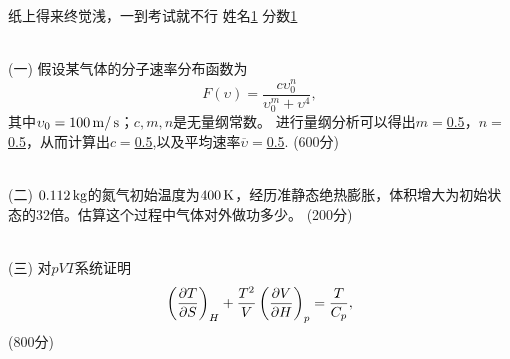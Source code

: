\documentclass[12pt,CJK]{article}
\def\mark#1{{\color{blue} (#1分)}}
\begin{document}
\bch


{\blue 纸上得来终觉浅，一到考试就不行} {} 姓名\uline{1} {\hskip 0.5in} 分数\uline{1}

{\vskip 0.3in}
\ \\
(一) 假设某气体的分子速率分布函数为
$$F(\upsilon) = \frac{c\upsilon_0^n}{\upsilon_0^m + \upsilon^4},$$
其中$\upsilon_0 = 100\,\mathrm{m}/\,\mathrm{s}$；$c, m,n$是无量纲常数。
进行量纲分析可以得出$m = $\uline{0.5}，$n=$\uline{0.5}，从而计算出$c=$\uline{0.5},以及平均速率$\overline{\upsilon} = $\uline{0.5}.  \mark{600}

{\vskip 0.1in}
\ \\
(二) $0.112\,\mathrm{kg}$的氮气初始温度为$400\,\mathrm{K}$，经历准静态绝热膨胀，体积增大为初始状态的$32$倍。估算这个过程中气体对外做功多少。\mark{200}

{\vskip 2.5in}
\ \\
(三) 对$pVT$系统证明 
  $$\left(\frac{\partial T}{\partial S}\right)_{H} +\frac{T^2}{V} \left(\frac{\partial V}{\partial H}\right)_{p} = \frac{T}{C_p}, $$
  \mark{800}



\ech
\end{document}
